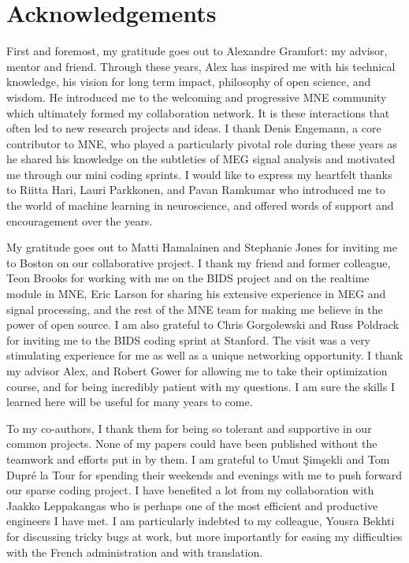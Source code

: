 \chapter*{Acknowledgements}
First and foremost, my gratitude goes out to Alexandre Gramfort: my advisor, mentor and friend. Through these years, Alex has inspired me with his technical knowledge, his vision for long term impact, philosophy of open science, and wisdom. He introduced me to the welcoming and progressive MNE community which ultimately formed my collaboration network. It is these interactions that often led to new research projects and ideas. I thank Denis Engemann, a core contributor to MNE, who played a particularly pivotal role during these years as he shared his knowledge on the subtleties of MEG signal analysis and motivated me through our mini coding sprints. I would like to express my heartfelt thanks to Riitta Hari, Lauri Parkkonen, and Pavan Ramkumar who introduced me to the world of machine learning in neuroscience, and offered words of support and encouragement over the years. 

My gratitude goes out to Matti Hamalainen and Stephanie Jones for inviting me to Boston on our collaborative project. I thank my friend and former colleague, Teon Brooks for working with me on the BIDS project and on the realtime module in MNE, Eric Larson for sharing his extensive experience in MEG and signal processing, and the rest of the MNE team for making me believe in the power of open source. I am also grateful to Chris Gorgolewski and Russ Poldrack for inviting me to the BIDS coding sprint at Stanford. The visit was a very stimulating experience for me as well as a unique networking opportunity. I thank my advisor Alex, and Robert Gower for allowing me to take their optimization course, and for being incredibly patient with my questions. I am sure the skills I learned here will be useful for many years to come.

To my co-authors, I thank them for being so tolerant and supportive in our common projects. None of my papers could have been published without the teamwork and efforts put in by them. I am grateful to Umut \c{S}im\c{s}ekli and Tom Dupr\'{e} la Tour for spending their weekends and evenings with me to push forward our sparse coding project. I have benefited a lot from my collaboration with Jaakko Leppakangas who is perhaps one of the most efficient and productive engineers I have met. I am particularly indebted to my colleague, Yousra Bekhti for discussing tricky bugs at work, but more importantly for easing my difficulties with the French administration and with translation.


